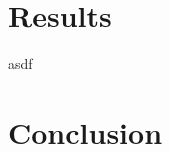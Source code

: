 \documentclass{article}
\begin{document}
\section{Results} \label{Results}
asdf

\section{Conclusion}


\pagebreak
\pagestyle{empty}



\end{document}
